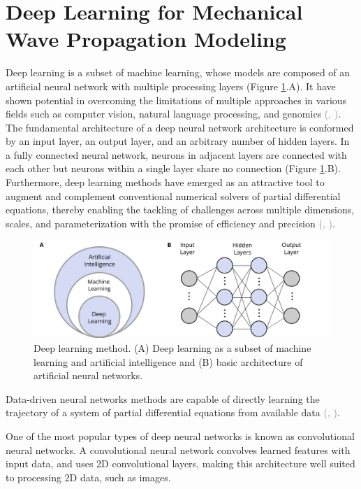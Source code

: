 \documentclass{tufte-handout}
\renewcommand{\citep}[2][]{\textcolor{gray}{(\citeauthor{#2}, \citeyear[#1]{#2})}}
\begin{document}
\section{Deep Learning for Mechanical Wave Propagation Modeling}\label{sec:dl_mwpm}




Deep learning is a subset of machine learning, whose models are composed of an artificial neural network with multiple processing layers (Figure \ref{deep_learning_subset_architecture}.A). It have shown potential in overcoming the limitations of multiple approaches in various fields such as computer vision, natural language processing, and genomics \citep{lecun_deep_2015,goodfellow_deep_2016}. The fundamental architecture of a deep neural network architecture is conformed by an input layer, an output layer, and an arbitrary number of hidden layers. In a fully connected neural network, neurons in adjacent layers are connected with each other but neurons within a single layer share no connection (Figure \ref{deep_learning_subset_architecture}.B). Furthermore, deep learning methods have emerged as an attractive tool to augment and complement conventional numerical solvers of partial differential equations, thereby enabling the tackling of challenges across multiple dimensions, scales, and parameterization with the promise of efficiency and precision \citep{blechschmidt_three_2021}. 

 
\begin{figure}
    \includegraphics[scale=1]{figs/deep_learning_subset_architecture.pdf}
    \caption{Deep learning method. (A) Deep learning as a subset of machine learning and artificial intelligence and (B) basic architecture of artificial neural networks.}
    \label{deep_learning_subset_architecture}
\end{figure}

 
Data-driven neural networks methods are capable of directly learning the trajectory of a system of partial differential equations from available data \citep{li_neural_2020,li_fourier_2021}.

One of the most popular types of deep neural networks is known as convolutional neural networks. A convolutional neural network convolves learned features with input data, and uses 2D convolutional layers, making this architecture well suited to processing 2D data, such as images.
\end{document}
